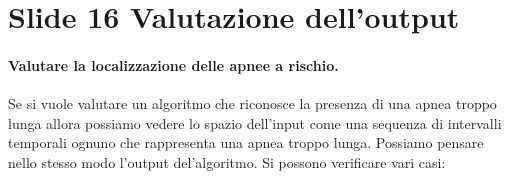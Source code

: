 \section{Slide 16 Valutazione dell'output}


\paragraph{Valutare la localizzazione delle apnee a rischio.}
Se si vuole valutare un algoritmo che riconosce la presenza di una apnea troppo lunga allora possiamo vedere lo spazio dell'input come una sequenza di intervalli temporali ognuno che rappresenta una apnea troppo lunga.
Possiamo pensare nello stesso modo l'output del'algoritmo.
Si possono verificare vari casi:



